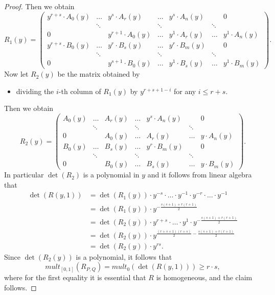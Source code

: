 \documentclass{article}
\newcommand{\rb}[1]{\left( #1 \right)}
\renewcommand{\sb}[1]{\left[ #1 \right]}
\theoremstyle{definition}\newtheorem{definition}{Definition}[section]
\theoremstyle{definition}\newtheorem{notation}[definition]{Notation}
\theoremstyle{definition}\newtheorem{remark}[definition]{Remark}
\theoremstyle{definition}\newtheorem{example1}[definition]{Example}
\theoremstyle{definition}\newtheorem{fact}{Fact}
\theoremstyle{definition}\newtheorem{exercise}{Exercise}
\theoremstyle{definition}\newtheorem*{example2}{Example}
\begin{document}
\begin{proof}
Then we obtain
$$ R_1\rb{y} = \begin{pmatrix}
y^{r + s} \cdot A_0\rb{y} & \dots & y^s \cdot A_r\rb{y} & \dots & y^s \cdot A_n\rb{y} & & 0 \\
& \ddots & & \ddots & & \ddots & \\
0 & & y^{r + 1} \cdot A_0\rb{y} & \dots & y^1 \cdot A_r\rb{y} & \dots & y^1 \cdot A_n\rb{y} \\
y^{r + s} \cdot B_0\rb{y} & \dots & y^r \cdot B_s\rb{y} & \dots & y^r \cdot B_m\rb{y} & & 0 \\
& \ddots & & \ddots & & \ddots & \\
0 & & y^{s + 1} \cdot B_0\rb{y} & \dots & y^1 \cdot B_s\rb{y} & \dots & y^1 \cdot B_m\rb{y}
\end{pmatrix}. $$
Now let $ R_2\rb{y} $ be the matrix obtained by
\begin{itemize}
\item dividing the $ i $-th column of $ R_1\rb{y} $ by $ y^{r + s + 1 - i} $ for any $ i \le r + s $.
\end{itemize}
Then we obtain
$$ R_2\rb{y} = \begin{pmatrix}
A_0\rb{y} & \dots & A_r\rb{y} & \dots & y^s \cdot A_n\rb{y} & & 0 \\
& \ddots & & \ddots & & \ddots & \\
0 & & A_0\rb{y} & \dots & A_r\rb{y} & \dots & y \cdot A_n\rb{y} \\
B_0\rb{y} & \dots & B_s\rb{y} & \dots & y^r \cdot B_m\rb{y} & & 0 \\
& \ddots & & \ddots & & \ddots & \\
0 & & B_0\rb{y} & \dots & B_s\rb{y} & \dots & y \cdot B_m\rb{y}
\end{pmatrix}. $$
In particular $ \det\rb{R_2} $ is a polynomial in $ y $ and it follows from linear algebra that
\begin{align*}
\det\rb{R\rb{y, 1}}
& = \det\rb{R_1\rb{y}} \cdot y^{-s} \cdot \dots \cdot y^{-1} \cdot y^{-r} \cdot \dots \cdot y^{-1} \\
& = \det\rb{R_1\rb{y}} \cdot y^{-\tfrac{s\rb{s + 1}+r\rb{r + 1}}{2}} \\
& = \det\rb{R_2\rb{y}} \cdot y^{r + s} \cdot \dots \cdot y^1 \cdot y^{-\tfrac{s\rb{s + 1} + r\rb{r + 1}}{2}} \\
& = \det\rb{R_2\rb{y}} \cdot y^{\tfrac{\rb{r + s + 1}\rb{r + s}}{2} - \tfrac{s\rb{s + 1}+r\rb{r + 1}}{2}} \\
& = \det\rb{R_2\rb{y}} \cdot y^{rs}.
\end{align*}
Since $ \det\rb{R_2\rb{y}} $ is a polynomial, it follows that
$$ mult_{\sb{0, 1}}\rb{R_{P, Q}} = mult_0\rb{\det\rb{R\rb{y, 1}}} \ge r \cdot s, $$
where for the first equality it is essential that $ R $ is homogeneous, and the claim follows.
\end{proof}
\end{document}
